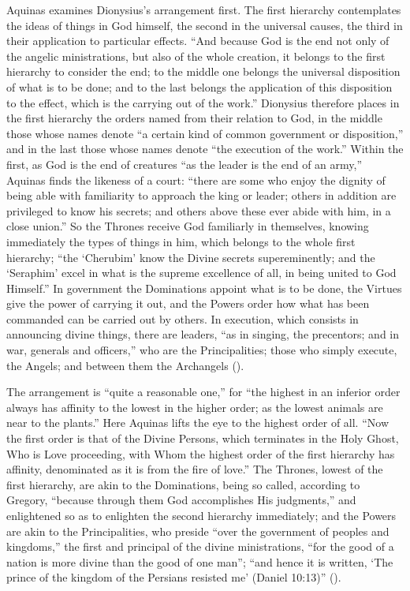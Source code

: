 Aquinas examines Dionysius's arrangement first. The first hierarchy
contemplates the ideas of things in God himself, the second in the universal
causes, the third in their application to particular effects. ``And because
God is the end not only of the angelic ministrations, but also of the whole
creation, it belongs to the first hierarchy to consider the end; to the
middle one belongs the universal disposition of what is to be done; and to
the last belongs the application of this disposition to the effect, which is
the carrying out of the work.'' Dionysius therefore places in the first
hierarchy the orders named from their relation to God, in the middle those
whose names denote ``a certain kind of common government or disposition,''
and in the last those whose names denote ``the execution of the work.''
Within the first, as God is the end of creatures ``as the leader is the end
of an army,'' Aquinas finds the likeness of a court: ``there are some who
enjoy the dignity of being able with familiarity to approach the king or
leader; others in addition are privileged to know his secrets; and others
above these ever abide with him, in a close union.'' So the Thrones receive
God familiarly in themselves, knowing immediately the types of things in
him, which belongs to the whole first hierarchy; ``the `Cherubim' know the
Divine secrets supereminently; and the `Seraphim' excel in what is the
supreme excellence of all, in being united to God Himself.'' In government
the Dominations appoint what is to be done, the Virtues give the power of
carrying it out, and the Powers order how what has been commanded can be
carried out by others. In execution, which consists in announcing divine
things, there are leaders, ``as in singing, the precentors; and in war,
generals and officers,'' who are the Principalities; those who simply
execute, the Angels; and between them the Archangels ().

The arrangement is ``quite a reasonable one,'' for ``the highest in an
inferior order always has affinity to the lowest in the higher order; as the
lowest animals are near to the plants.'' Here Aquinas lifts the eye to the
highest order of all. ``Now the first order is that of the Divine Persons,
which terminates in the Holy Ghost, Who is Love proceeding, with Whom the
highest order of the first hierarchy has affinity, denominated as it is from
the fire of love.'' The Thrones, lowest of the first hierarchy, are akin to
the Dominations, being so called, according to Gregory, ``because through
them God accomplishes His judgments,'' and enlightened so as to enlighten the second
hierarchy immediately; and the Powers are akin to the Principalities, who
preside ``over the government of peoples and kingdoms,'' the first and
principal of the divine ministrations, ``for the good of a nation is more
divine than the good of one man''; ``and hence it is written, `The prince of
the kingdom of the Persians resisted me' (Daniel 10:13)'' ().

